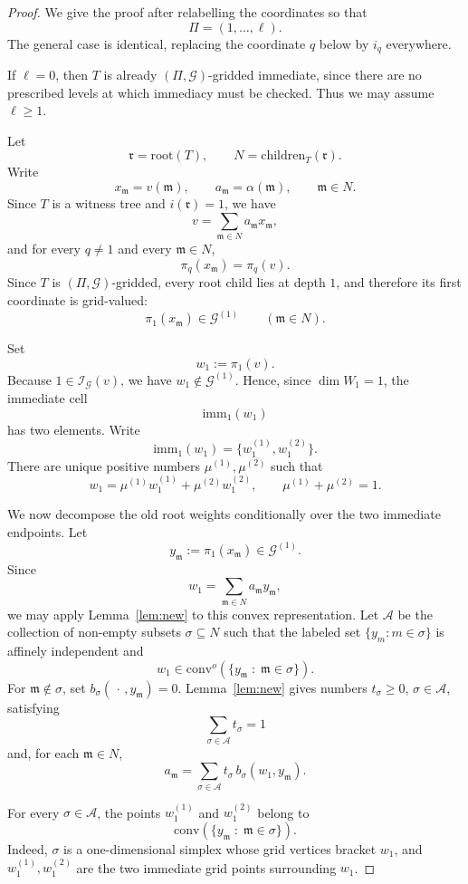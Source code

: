 \documentclass[10pt]{amsart}
\theoremstyle{plain}
\theoremstyle{definition}
\providecommand{\cG}[0]{\ensuremath{\mathcal G}\xspace}
\providecommand{\cI}[0]{\ensuremath{\mathcal I}\xspace}
\let\geq\geqslant
\providecommand{\imm}[0]{\ensuremath{\mathrm{imm}}\xspace}
\providecommand{\conv}[1]{\ensuremath{\mathrm{conv}{\left({#1}\right)}\xspace}}
\providecommand{\convo}[1]{\ensuremath{\mathrm{conv}^o{\left({#1}\right)}\xspace}}
\newcommand{\fr}{\mathfrak{r}}
\newcommand{\fm}{\mathfrak{m}}
\begin{document}
\begin{proof}
We give the proof after relabelling the coordinates so that
\[
  \Pi=(1,\ldots,\ell).
\]
The general case is identical, replacing the coordinate $q$ below by
$i_q$ everywhere.

If $\ell=0$, then $T$ is already $(\Pi,\cG)$-gridded immediate, since
there are no prescribed levels at which immediacy must be checked.
Thus we may assume $\ell\geq 1$.

Let
\[
  \fr=\mathrm{root}(T), \qquad N=\mathrm{children}_T(\fr).
\]
Write
\[
  x_\fm=v(\fm),\qquad a_\fm=\alpha(\fm),\qquad \fm\in N.
\]
Since $T$ is a witness tree and $i(\fr)=1$, we have
\[
  v=\sum_{\fm\in N} a_\fm x_\fm,
\]
and for every $q\neq 1$ and every $\fm\in N$,
\[
  \pi_q(x_\fm)=\pi_q(v).
\]
Since $T$ is $(\Pi,\cG)$-gridded, every root child lies at
depth $1$, and therefore its first coordinate is grid-valued:
\[
  \pi_1(x_\fm)\in \cG^{(1)}\qquad (\fm\in N).
\]

Set
\[
  w_1:=\pi_1(v).
\]
Because $1\in \cI_{\cG}(v)$, we have $w_1\notin \cG^{(1)}$. Hence, since
$\dim W_1=1$, the immediate cell
\[
  \imm_1(w_1)
\]
has two elements. Write
\[
  \imm_1(w_1)=\{w_1^{(1)},w_1^{(2)}\}.
\]
There are unique positive numbers $\mu^{(1)},\mu^{(2)}$ such that
\[
  w_1=\mu^{(1)} w_1^{(1)}+\mu^{(2)}w_1^{(2)},\qquad
  \mu^{(1)}+\mu^{(2)}=1.
\]

We now decompose the old root weights conditionally over the two
immediate endpoints. Let
\[
  y_\fm:=\pi_1(x_\fm)\in \cG^{(1)}.
\]
Since
\[
  w_1=\sum_{\fm\in N} a_\fm y_\fm,
\]
we may apply Lemma~\ref{lem:new} to this convex representation.  Let
$\mathcal A$ be the collection of non-empty subsets
$\sigma\subseteq N$ such that the labeled set
$\{y_m:m\in\sigma\}$ is affinely independent and
\[
  w_1\in 
  \convo{\{y_\fm \;:\; \fm\in\sigma\}}.
\]
For $\fm\notin\sigma$, set $b_\sigma(\,\cdot\,,y_\fm)=0$.  Lemma~\ref{lem:new}  gives
numbers $t_\sigma\geq 0$, $\sigma\in\mathcal A$, satisfying
\[
  \sum_{\sigma\in\mathcal A}t_\sigma=1
\]
and, for each $\fm\in N$,
\begin{equation}\label{eq:old-weight-decomp}
  a_\fm
  =
  \sum_{\sigma\in\mathcal A}
  t_\sigma\, b_\sigma(w_1,y_\fm).
\end{equation}

For every $\sigma\in\mathcal A$, the points $w_1^{(1)}$ and
$w_1^{(2)}$ belong to
\[
  \conv{\{y_\fm \;:\; \fm\in\sigma\}}.
\]
Indeed, $\sigma$ is a one-dimensional simplex whose grid vertices
bracket $w_1$, and $w_1^{(1)},w_1^{(2)}$ are the two immediate grid
points surrounding $w_1$.


\end{proof}
\end{document}
